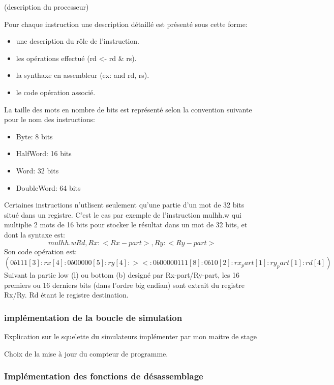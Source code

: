 (description du processeur)
 
Pour chaque instruction une description détaillé est présenté sous cette forme:

\begin{itemize}
\item une description du rôle de l'instruction.
\item les opérations effectué (rd <- rd \& rs).
\item la synthaxe en assembleur (ex: and rd, rs).
\item le code opération associé.
\end{itemize}

La taille des mots en nombre de bits est représenté selon la convention suivante pour le nom des instructions:

\begin{itemize}
\item Byte: 8 bits
\item HalfWord: 16 bits
\item Word: 32 bits
\item DoubleWord: 64 bits
\end{itemize}

Certaines instructions n'utlisent seulement qu'une partie d'un mot de 32 bits situé dans un registre.
C'est le cas par exemple de l'instruction mulhh.w qui multiplie 2 mots de 16 bits pour stocker le résultat dans un mot de 32 bits, et dont la syntaxe est:
\[ mulhh.w Rd, Rx:<Rx-part>, Ry:<Ry-part> \]
Son code opération est: \[(0b111[3]:rx[4]:0b00000[5]:ry[4]:><:0b00000111[8]:0b10[2]:rx_part[1]:ry_part[1]:rd[4]) \]
Suivant la partie low (l) ou bottom (b) designé par Rx-part/Ry-part, les 16 premiers ou 16 derniers bits (dans l'ordre big endian) sont extrait du registre Rx/Ry. 
Rd étant le registre destination. 

\subsubsection{implémentation de la boucle de simulation}

Explication sur le squelette du simulateurs implémenter par mon maitre de stage

Choix de la mise à jour du compteur de programme.

\subsubsection{Implémentation des fonctions de désassemblage}

